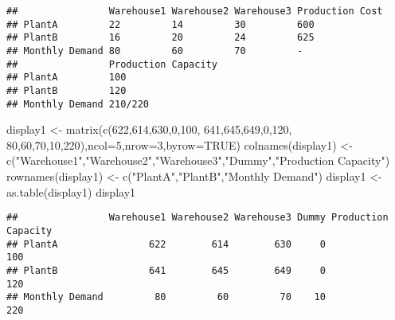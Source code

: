 \documentclass[
]{article}
\newenvironment{Shaded}{\begin{snugshade}}{\end{snugshade}}
\newcommand{\AttributeTok}[1]{\textcolor[rgb]{0.77,0.63,0.00}{#1}}
\newcommand{\ConstantTok}[1]{\textcolor[rgb]{0.00,0.00,0.00}{#1}}
\newcommand{\DecValTok}[1]{\textcolor[rgb]{0.00,0.00,0.81}{#1}}
\newcommand{\FunctionTok}[1]{\textcolor[rgb]{0.00,0.00,0.00}{#1}}
\newcommand{\NormalTok}[1]{#1}
\newcommand{\OtherTok}[1]{\textcolor[rgb]{0.56,0.35,0.01}{#1}}
\newcommand{\StringTok}[1]{\textcolor[rgb]{0.31,0.60,0.02}{#1}}
\begin{document}
\begin{verbatim}
##                Warehouse1 Warehouse2 Warehouse3 Production Cost
## PlantA         22         14         30         600            
## PlantB         16         20         24         625            
## Monthly Demand 80         60         70         -              
##                Production Capacity
## PlantA         100                
## PlantB         120                
## Monthly Demand 210/220
\end{verbatim}

\begin{Shaded}
\begin{Highlighting}[]
\NormalTok{  display1 }\OtherTok{\textless{}{-}} \FunctionTok{matrix}\NormalTok{(}\FunctionTok{c}\NormalTok{(}\DecValTok{622}\NormalTok{,}\DecValTok{614}\NormalTok{,}\DecValTok{630}\NormalTok{,}\DecValTok{0}\NormalTok{,}\DecValTok{100}\NormalTok{,}
                  \DecValTok{641}\NormalTok{,}\DecValTok{645}\NormalTok{,}\DecValTok{649}\NormalTok{,}\DecValTok{0}\NormalTok{,}\DecValTok{120}\NormalTok{,}
                  \DecValTok{80}\NormalTok{,}\DecValTok{60}\NormalTok{,}\DecValTok{70}\NormalTok{,}\DecValTok{10}\NormalTok{,}\DecValTok{220}\NormalTok{),}\AttributeTok{ncol=}\DecValTok{5}\NormalTok{,}\AttributeTok{nrow=}\DecValTok{3}\NormalTok{,}\AttributeTok{byrow=}\ConstantTok{TRUE}\NormalTok{)}
 \FunctionTok{colnames}\NormalTok{(display1) }\OtherTok{\textless{}{-}} \FunctionTok{c}\NormalTok{(}\StringTok{"Warehouse1"}\NormalTok{,}\StringTok{"Warehouse2"}\NormalTok{,}\StringTok{"Warehouse3"}\NormalTok{,}\StringTok{"Dummy"}\NormalTok{,}\StringTok{"Production Capacity"}\NormalTok{)}
 \FunctionTok{rownames}\NormalTok{(display1) }\OtherTok{\textless{}{-}} \FunctionTok{c}\NormalTok{(}\StringTok{"PlantA"}\NormalTok{,}\StringTok{"PlantB"}\NormalTok{,}\StringTok{"Monthly Demand"}\NormalTok{)}
\NormalTok{ display1 }\OtherTok{\textless{}{-}} \FunctionTok{as.table}\NormalTok{(display1)}
\NormalTok{ display1}
\end{Highlighting}
\end{Shaded}

\begin{verbatim}
##                Warehouse1 Warehouse2 Warehouse3 Dummy Production Capacity
## PlantA                622        614        630     0                 100
## PlantB                641        645        649     0                 120
## Monthly Demand         80         60         70    10                 220
\end{verbatim}
\end{document}
